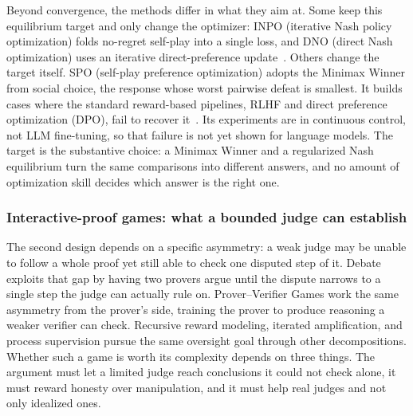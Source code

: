 Beyond convergence, the methods differ in what they aim at. Some keep this equilibrium
target and only change the optimizer: INPO (iterative Nash policy optimization) folds
no-regret self-play into a single loss, and DNO (direct Nash optimization) uses an
iterative direct-preference update~\citep{Zhang2025INPO,Rosset2024DNO}. Others change the target itself. SPO (self-play preference optimization)
adopts the Minimax Winner from social choice, the response whose worst
pairwise defeat is smallest. It builds cases where the standard reward-based
pipelines, RLHF and direct preference optimization (DPO), fail to recover
it~\citep{Swamy2024SPO}. Its experiments are in continuous control, not LLM
fine-tuning, so that failure is not yet shown for language models. The target is the substantive choice: a Minimax
Winner and a regularized Nash equilibrium turn the same comparisons into different
answers, and no amount of optimization skill decides which answer is the right one.

\subsubsection{Interactive-proof games: what a bounded judge can establish}

The second design depends on a specific asymmetry: a weak judge may be unable to follow
a whole proof yet still able to check one disputed step of it. Debate exploits that gap by
having two provers argue until the dispute narrows to a single step the judge can
actually rule on. Prover--Verifier Games work the same asymmetry from the prover's
side, training the prover to produce reasoning a weaker verifier can check.
Recursive reward modeling, iterated amplification, and process supervision
pursue the same oversight goal through other decompositions. Whether such a game is worth its complexity depends on three things. The
argument must let a limited judge reach conclusions it could not check alone,
it must reward honesty over manipulation, and it must help real judges and not
only idealized ones.

